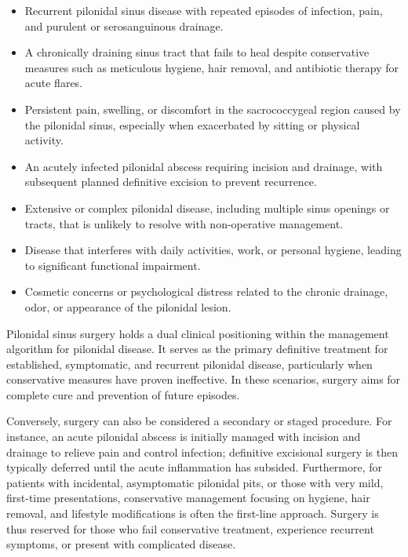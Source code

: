 \begin{itemize}
  \item Recurrent pilonidal sinus disease with repeated episodes of infection, pain, and purulent or serosanguinous drainage.
  \item A chronically draining sinus tract that fails to heal despite conservative measures such as meticulous hygiene, hair removal, and antibiotic therapy for acute flares.
  \item Persistent pain, swelling, or discomfort in the sacrococcygeal region caused by the pilonidal sinus, especially when exacerbated by sitting or physical activity.
  \item An acutely infected pilonidal abscess requiring incision and drainage, with subsequent planned definitive excision to prevent recurrence.
  \item Extensive or complex pilonidal disease, including multiple sinus openings or tracts, that is unlikely to resolve with non-operative management.
  \item Disease that interferes with daily activities, work, or personal hygiene, leading to significant functional impairment.
  \item Cosmetic concerns or psychological distress related to the chronic drainage, odor, or appearance of the pilonidal lesion.
\end{itemize}

Pilonidal sinus surgery holds a dual clinical positioning within the management algorithm for pilonidal disease. It serves as the primary definitive treatment for established, symptomatic, and recurrent pilonidal disease, particularly when conservative measures have proven ineffective. In these scenarios, surgery aims for complete cure and prevention of future episodes.

Conversely, surgery can also be considered a secondary or staged procedure. For instance, an acute pilonidal abscess is initially managed with incision and drainage to relieve pain and control infection; definitive excisional surgery is then typically deferred until the acute inflammation has subsided. Furthermore, for patients with incidental, asymptomatic pilonidal pits, or those with very mild, first-time presentations, conservative management focusing on hygiene, hair removal, and lifestyle modifications is often the first-line approach. Surgery is thus reserved for those who fail conservative treatment, experience recurrent symptoms, or present with complicated disease.

